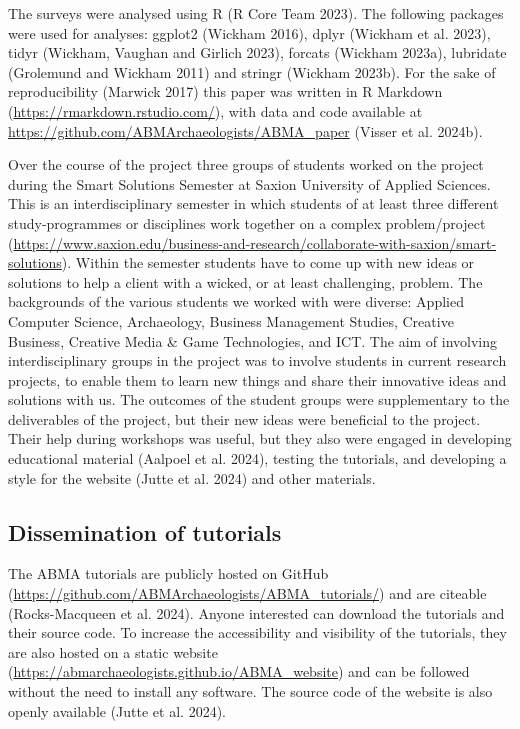 \documentclass[
]{article}
\begin{document}
The surveys were analysed using R (R Core Team 2023). The following packages were used for analyses: ggplot2 (Wickham 2016), dplyr (Wickham et al. 2023), tidyr (Wickham, Vaughan and Girlich 2023), forcats (Wickham 2023a), lubridate (Grolemund and Wickham 2011) and stringr (Wickham 2023b). For the sake of reproducibility (Marwick 2017) this paper was written in R Markdown (\url{https://rmarkdown.rstudio.com/}), with data and code available at \url{https://github.com/ABMArchaeologists/ABMA_paper} (Visser et al. 2024b).

Over the course of the project three groups of students worked on the project during the Smart Solutions Semester at Saxion University of Applied Sciences. This is an interdisciplinary semester in which students of at least three different study-programmes or disciplines work together on a complex problem/project (\url{https://www.saxion.edu/business-and-research/collaborate-with-saxion/smart-solutions}). Within the semester students have to come up with new ideas or solutions to help a client with a wicked, or at least challenging, problem. The backgrounds of the various students we worked with were diverse: Applied Computer Science, Archaeology, Business Management Studies, Creative Business, Creative Media \& Game Technologies, and ICT. The aim of involving interdisciplinary groups in the project was to involve students in current research projects, to enable them to learn new things and share their innovative ideas and solutions with us. The outcomes of the student groups were supplementary to the deliverables of the project, but their new ideas were beneficial to the project. Their help during workshops was useful, but they also were engaged in developing educational material (Aalpoel et al. 2024), testing the tutorials, and developing a style for the website (Jutte et al. 2024) and other materials.

\hypertarget{dissemination-of-tutorials}{%
\subsection{Dissemination of tutorials}\label{dissemination-of-tutorials}}

The ABMA tutorials are publicly hosted on GitHub (\url{https://github.com/ABMArchaeologists/ABMA_tutorials/}) and are citeable (Rocks-Macqueen et al. 2024). Anyone interested can download the tutorials and their source code. To increase the accessibility and visibility of the tutorials, they are also hosted on a static website (\url{https://abmarchaeologists.github.io/ABMA_website}) and can be followed without the need to install any software. The source code of the website is also openly available (Jutte et al. 2024).
\end{document}
